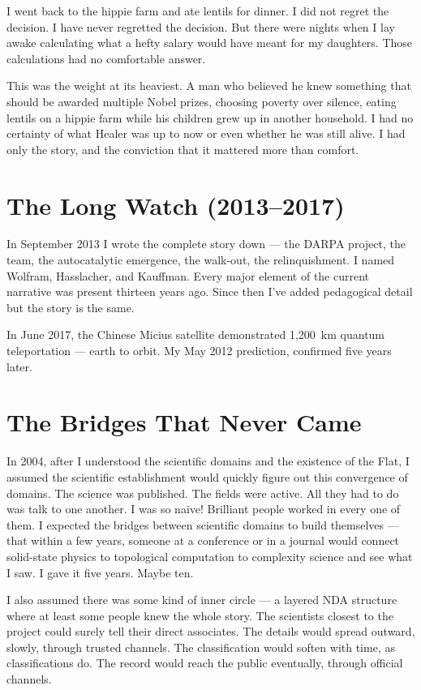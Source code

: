I went back to the hippie farm and ate lentils for dinner. I did not regret the decision. I have never regretted the decision. But there were nights when I lay awake calculating what a hefty salary would have meant for my daughters. Those calculations had no comfortable answer.

This was the weight at its heaviest. A man who believed he knew something that should be awarded multiple Nobel prizes, choosing poverty over silence, eating lentils on a hippie farm while his children grew up in another household. I had no certainty of what Healer was up to now or even whether he was still alive. I had only the story, and the conviction that it mattered more than comfort.

\section*{The Long Watch (2013--2017)}
\label{record:ty-the-long-watch}

In September 2013 I wrote the complete story down --- the DARPA project, the team, the autocatalytic emergence, the walk-out, the relinquishment. I named Wolfram, Hasslacher, and Kauffman. Every major element of the current narrative was present thirteen years ago. Since then I've added pedagogical detail but the story is the same.

In June 2017, the Chinese Micius satellite demonstrated 1,200~km quantum teleportation --- earth to orbit. My May 2012 prediction, confirmed five years later.

\section*{The Bridges That Never Came}
\label{record:ty-bridges-that-never-came}

In 2004, after I understood the scientific domains and the existence of the Flat, I assumed the scientific establishment would quickly figure out this convergence of domains. The science was published. The fields were active. All they had to do was talk to one another. I was so naive! Brilliant people worked in every one of them. I expected the bridges between scientific domains to build themselves --- that within a few years, someone at a conference or in a journal would connect solid-state physics to topological computation to complexity science and see what I saw. I gave it five years. Maybe ten.

I also assumed there was some kind of inner circle --- a layered NDA structure where at least some people knew the whole story. The scientists closest to the project could surely tell their direct associates. The details would spread outward, slowly, through trusted channels. The classification would soften with time, as classifications do. The record would reach the public eventually, through official channels.

